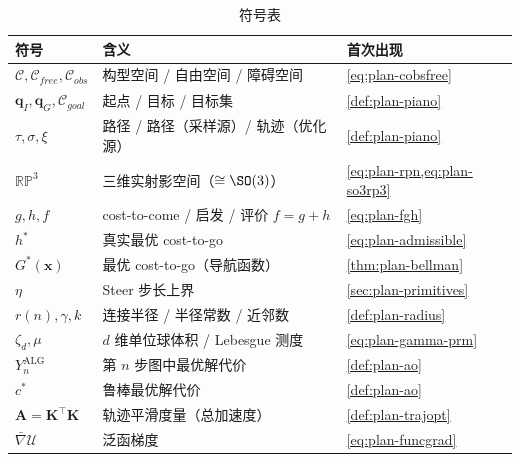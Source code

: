 \begin{table}[H]\centering\small
\caption{符号表}
\begin{tabular}{lll}
\toprule
符号 & 含义 & 首次出现 \\
\midrule
$\mathcal{C},\mathcal{C}_{free},\mathcal{C}_{obs}$ & 构型空间 / 自由空间 / 障碍空间 & \cref{eq:plan-cobsfree} \\
$\mathbf{q}_I,\mathbf{q}_G,\mathcal{C}_{goal}$ & 起点 / 目标 / 目标集 & \cref{def:plan-piano} \\
$\tau,\sigma,\xi$ & 路径 / 路径（采样源）/ 轨迹（优化源） & \cref{def:plan-piano} \\
$\mathbb{RP}^3$ & 三维实射影空间（$\cong\SO(3)$） & \cref{eq:plan-rpn,eq:plan-so3rp3} \\
$g,h,f$ & cost-to-come / 启发 / 评价 $f=g+h$ & \cref{eq:plan-fgh} \\
$h^*$ & 真实最优 cost-to-go & \cref{eq:plan-admissible} \\
$G^*(\mathbf{x})$ & 最优 cost-to-go（导航函数） & \cref{thm:plan-bellman} \\
$\eta$ & Steer 步长上界 & \cref{sec:plan-primitives} \\
$r(n),\gamma,k$ & 连接半径 / 半径常数 / 近邻数 & \cref{def:plan-radius} \\
$\zeta_d,\mu$ & $d$ 维单位球体积 / Lebesgue 测度 & \cref{eq:plan-gamma-prm} \\
$Y_n^{\mathrm{ALG}}$ & 第 $n$ 步图中最优解代价 & \cref{def:plan-ao} \\
$c^*$ & 鲁棒最优解代价 & \cref{def:plan-ao} \\
$\mathbf{A}=\mathbf{K}^\top\mathbf{K}$ & 轨迹平滑度量（总加速度） & \cref{def:plan-trajopt} \\
$\bar\nabla\mathcal{U}$ & 泛函梯度 & \cref{eq:plan-funcgrad} \\
\bottomrule
\end{tabular}
\end{table}

